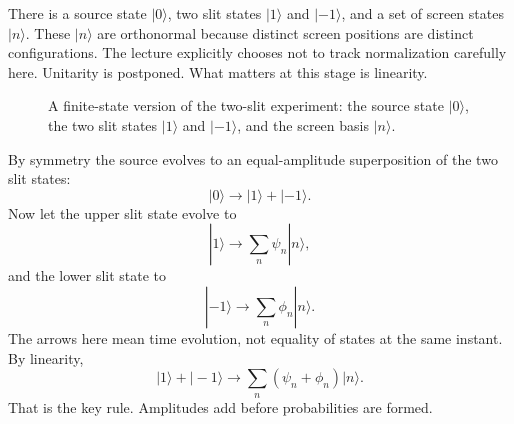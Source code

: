 There is a source state \(|0\rangle\), two slit states \(|1\rangle\) and \(|-1\rangle\), and a set of screen states \(|n\rangle\). These \(|n\rangle\) are orthonormal because distinct screen positions are distinct configurations. The lecture explicitly chooses not to track normalization carefully here. Unitarity is postponed. What matters at this stage is linearity.

\begin{figure}[htbp]
\centering
{}
\caption{A finite-state version of the two-slit experiment: the source state \(|0\rangle\), the two slit states \(|1\rangle\) and \(|-1\rangle\), and the screen basis \(|n\rangle\).}
\end{figure}

By symmetry the source evolves to an equal-amplitude superposition of the two slit states:
\begin{equation}
|0\rangle \longrightarrow |1\rangle+|-1\rangle.
\end{equation}
Now let the upper slit state evolve to
\begin{equation}
|1\rangle \longrightarrow \sum_n \psi_n |n\rangle,
\end{equation}
and the lower slit state to
\begin{equation}
|-1\rangle \longrightarrow \sum_n \phi_n |n\rangle.
\end{equation}
The arrows here mean time evolution, not equality of states at the same instant. By linearity,
\begin{equation}
|1\rangle+|-1\rangle \longrightarrow \sum_n (\psi_n+\phi_n)|n\rangle.
\end{equation}
That is the key rule. Amplitudes add before probabilities are formed.

